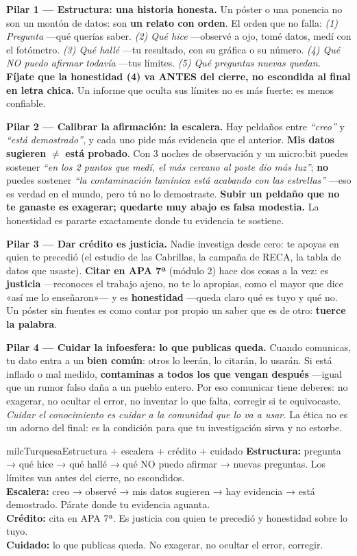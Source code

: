 \documentclass[11pt,letterpaper]{article}
\newcommand{\milcpaso}[3]{%
\Needspace{4\baselineskip}%
\begin{tcolorbox}[enhanced,colback=white,colframe=milcLinea,arc=1.5mm,boxrule=.9pt,
  left=14mm,right=4mm,top=3mm,bottom=3mm,before skip=4pt,after skip=4pt,
  fontupper=\RaggedRight,
  overlay={\node[anchor=north west,circle,fill=#2,text=white,inner sep=0pt,
    minimum size=7.4mm,font=\sffamily\bfseries\small]
    at ([xshift=3.6mm,yshift=-3.2mm]frame.north west) {#1};}]
#3
\end{tcolorbox}}
\begin{document}
\milcpaso{1}{milcTurquesa}{\textbf{Pilar 1 --- Estructura: una historia honesta.} Un póster o una ponencia no son un montón de datos: son \textbf{un relato con orden}. El orden que no falla: \emph{(1) Pregunta} ---qué querías saber. \emph{(2) Qué hice} ---observé a ojo, tomé datos, medí con el fotómetro. \emph{(3) Qué hallé} ---tu resultado, con su gráfica o su número. \emph{(4) Qué NO puedo afirmar todavía} ---tus límites. \emph{(5) Qué preguntas nuevas quedan.} \textbf{Fíjate que la honestidad (4) va ANTES del cierre, no escondida al final en letra chica.} Un informe que oculta sus límites no es más fuerte: es menos confiable.}
\milcpaso{2}{milcTurquesa}{\textbf{Pilar 2 --- Calibrar la afirmación: la escalera.} Hay peldaños entre \emph{``creo''} y \emph{``está demostrado''}, y cada uno pide más evidencia que el anterior. \textbf{Mis datos sugieren} $\neq$ \textbf{está probado}. Con 3 noches de observación y un micro:bit puedes sostener \emph{``en los 2 puntos que medí, el más cercano al poste dio más luz''}; \textbf{no} puedes sostener \emph{``la contaminación lumínica está acabando con las estrellas''} ---eso es verdad en el mundo, pero tú no lo demostraste. \textbf{Subir un peldaño que no te ganaste es exagerar; quedarte muy abajo es falsa modestia.} La honestidad es pararte exactamente donde tu evidencia te sostiene.}
\milcpaso{3}{milcTurquesa}{\textbf{Pilar 3 --- Dar crédito es justicia.} Nadie investiga desde cero: te apoyas en quien te precedió (el estudio de las Cabrillas, la campaña de RECA, la tabla de datos que usaste). \textbf{Citar en APA 7ª} (módulo 2) hace dos cosas a la vez: es \textbf{justicia} ---reconoces el trabajo ajeno, no te lo apropias, como el mayor que dice «así me lo enseñaron»--- y es \textbf{honestidad} ---queda claro qué es tuyo y qué no. Un póster sin fuentes es como contar por propio un saber que es de otro: \textbf{tuerce la palabra}.}
\milcpaso{4}{milcTurquesa}{\textbf{Pilar 4 --- Cuidar la infoesfera: lo que publicas queda.} Cuando comunicas, tu dato entra a un \textbf{bien común}: otros lo leerán, lo citarán, lo usarán. Si está inflado o mal medido, \textbf{contaminas a todos los que vengan después} ---igual que un rumor falso daña a un pueblo entero. Por eso comunicar tiene deberes: no exagerar, no ocultar el error, no inventar lo que falta, corregir si te equivocaste. \emph{Cuidar el conocimiento es cuidar a la comunidad que lo va a usar.} La ética no es un adorno del final: es la condición para que tu investigación sirva y no estorbe.}

\begin{drawbox}{milcTurquesa}{Estructura + escalera + crédito + cuidado}
\textbf{Estructura:} pregunta → qué hice → qué hallé → qué NO puedo afirmar → nuevas preguntas. Los límites van antes del cierre, no escondidos. \\[1mm]
\textbf{Escalera:} creo → observé → mis datos sugieren → hay evidencia → está demostrado. Párate donde tu evidencia aguanta. \\[1mm]
\textbf{Crédito:} cita en APA 7ª. Es justicia con quien te precedió y honestidad sobre lo tuyo. \\[1mm]
\textbf{Cuidado:} lo que publicas queda. No exagerar, no ocultar el error, corregir.
\end{drawbox}
\end{document}
